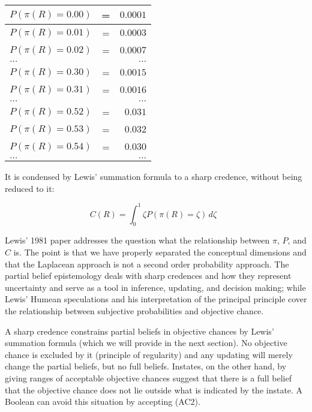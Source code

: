 \documentclass[11pt]{article}
\begin{document}
\begin{tabular}{|lcr|}
  \hline
  $P(\pi(R)=0.00)$ & = & $0.0001$ \\ \hline
  $P(\pi(R)=0.01)$ & = & $0.0003$ \\ \hline
  $P(\pi(R)=0.02)$ & = & $0.0007$ \\ \hline
  $\ldots$ & & $\ldots$ \\ \hline
  $P(\pi(R)=0.30)$ & = & $0.0015$ \\ \hline
  $P(\pi(R)=0.31)$ & = & $0.0016$ \\ \hline
  $\ldots$ & & $\ldots$ \\ \hline
  $P(\pi(R)=0.52)$ & = & $0.031$ \\ \hline
  $P(\pi(R)=0.53)$ & = & $0.032$ \\ \hline
  $P(\pi(R)=0.54)$ & = & $0.030$ \\ \hline
  $\ldots$ & & $\ldots$ \\ \hline
\end{tabular}

It is condensed by Lewis' summation formula to a sharp credence,
without being reduced to it:

\begin{equation}
  \label{eq:s2}
  C(R)=\int_{0}^{1}\zeta{}P(\pi(R)=\zeta)\,d\zeta\mbox{ }
\end{equation}

Lewis' 1981 paper 
addresses the question what the relationship between $\pi$, $P$, and
$C$ is. The point is that we have properly separated the conceptual
dimensions and that the Laplacean approach is not a second order
probability approach. The partial belief epistemology deals with sharp
credences and how they represent uncertainty and serve as a tool in
inference, updating, and decision making; while Lewis' Humean
speculations and his interpretation of the principal principle cover
the relationship between subjective probabilities and objective
chance.

A sharp credence constrains partial beliefs in objective chances by
Lewis' summation formula (which we will provide in the next section).
No objective chance is excluded by it (principle of regularity) and
any updating will merely change the partial beliefs, but no full
beliefs. Instates, on the other hand, by giving ranges of acceptable
objective chances suggest that there is a full belief that the
objective chance does not lie outside what is indicated by the
instate. A Boolean can avoid this situation by accepting (AC2).
\end{document}
